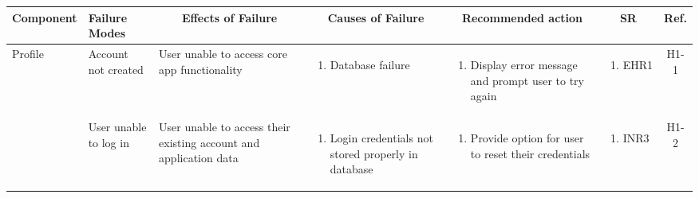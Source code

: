 \documentclass{article}
\begin{document}
\renewcommand{\arraystretch}{1.5}
\begin{longtable}{|p{1.7cm}|p{1.7cm} p{2.4cm} p{2.4cm} p{3.5cm} p{1.6cm} c|}
 \hline 
 \multicolumn{1}{|c|}{Component} & \multicolumn{1}{p{1.5cm}}{Failure Modes} & \multicolumn{1}{c}{Effects of Failure} & \multicolumn{1}{c}{Causes of Failure} & \multicolumn{1}{c}{Recommended action} & \multicolumn{1}{c}{SR} & \multicolumn{1}{c|}{Ref.}\\
 \hline
 Profile & Account not created & User unable to access core app functionality & \vspace*{-\baselineskip}\begin{enumerate}[label=\alph*., left=0pt, nosep]\item Database failure \end{enumerate} & \vspace*{-\baselineskip}\begin{enumerate}[label=\alph*., left=0pt, nosep]\item Display error message and prompt user to try again \end{enumerate} & \vspace*{-\baselineskip}\begin{enumerate}[label=\alph*., left=0pt, nosep] \item EHR1 \end{enumerate} & H1-1\\
 \cline{2-7}
  & User unable to log in & User unable to access their existing account and application data & \vspace*{-\baselineskip}\begin{enumerate}[label=\alph*., left=0pt, nosep]\item Login credentials not stored properly in database \end{enumerate} & \vspace*{-\baselineskip}\begin{enumerate}[label=\alph*., left=0pt, nosep]\item Provide option for user to reset their credentials \end{enumerate} & \vspace*{-\baselineskip}\begin{enumerate}[label=\alph*., left=0pt, nosep] \item INR3 \end{enumerate} & H1-2\\
 \cline{2-7}

\end{longtable}
\end{document}
